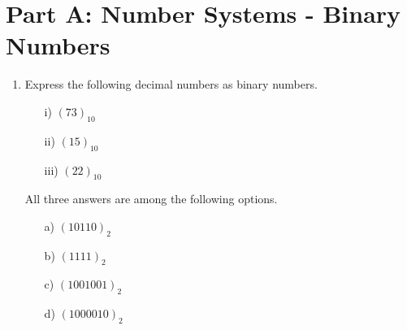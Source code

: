 \documentclass[]{report}
\begin{document}
	\section*{Part A: Number Systems - Binary Numbers}
	\begin{enumerate}
		\item Express the following decimal numbers as binary numbers.
		\begin{multicols}{4}
			\begin{itemize}
				\item[i)] $(73)_{10}$
				\item[ii)] $(15)_{10}$
				\item[iii)] $(22)_{10}$
			\end{itemize}
		\end{multicols}
		
		All three answers are among the following options.
		\begin{multicols}{4}
			\begin{itemize}
				\item[a)] $(10110)_{2}$ %
				\item[b)] $(1111)_{2}$ %
				\item[c)] $(1001001)_{2}$ %
				\item[d)] $(1000010)_{2}$ %
			\end{itemize}
		\end{multicols}
		

\end{enumerate}
\end{document}
